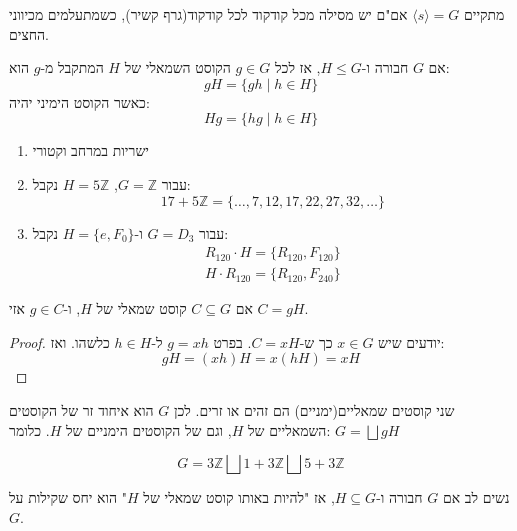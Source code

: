 \documentclass{tstextbook}
\begin{document}
\begin{proposition}
מתקיים \(\langle s\rangle=G\) אם"ם יש מסילה מכל קודקוד לכל קודקוד(גרף קשיר), כשמתעלמים מכיווני החצים.

\end{proposition}
\begin{definition}[קוסט]
אם \(G\) חבורה ו-\(H\leq G\), אז לכל \(g \in G\) הקוסט השמאלי של \(H\) המתקבל מ-\(g\) הוא:
$$gH=\{ gh\;|\; h\in H\}$$
כאשר הקוסט הימיני יהיה:
$$Hg=\{ hg \;|\; h\in H \}$$

\end{definition}
\begin{example}
  \begin{enumerate}
    \item ישריות במרחב וקטורי 


    \item עבור \(G=\mathbb{Z}\), \(H=5\mathbb{Z}\) נקבל: 
$$17+5\mathbb{Z}=\{ \dots,7,12,17,22,27,32,\dots \}$$


    \item עבור \(G=D_{3}\) ו-\(H=\{ e,F_{0} \}\) נקבל: 
\begin{gather*}R_{120}\cdot H=\{ R_{120}, F_{120} \} \\H\cdot R_{120}=\{ R_{120}, F_{240} \}
\end{gather*}


  \end{enumerate}
\end{example}
\begin{corollary}
אם \(C\subseteq G\) קוסט שמאלי של \(H\), ו-\(g \in C\) אזי \(C=gH\).

\end{corollary}
\begin{proof}
יודעים שיש \(x \in G\) כך ש-\(C=xH\). בפרט \(g=xh\) ל-\(h \in H\) כלשהו. ואז:
$$gH=(xh)H=x(hH)=xH$$

\end{proof}
\begin{corollary}
שני קוסטים שמאליים(ימניים) הם זהים או זרים. לכן \(G\) הוא איחוד זר של הקוסטים השמאליים של \(H\), וגם של הקוסטים הימניים של \(H\). כלומר: \(G=\bigsqcup gH\)

\end{corollary}
\begin{example}
$$G=3\mathbb{Z} \bigsqcup 1+3\mathbb{Z}\bigsqcup 5+3\mathbb{Z}$$

\end{example}
\begin{remark}
נשים לב אם \(G\) חבורה ו-\(H\subseteq G\), אז "להיות באותו קוסט שמאלי של \(H\)" הוא יחס שקילות על \(G\).

\end{remark}
\end{document}

